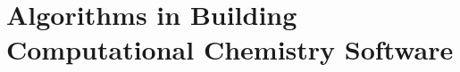 \documentclass[a4paper,12pt,oneside]{book}
\theoremstyle{definition}\newtheorem{law}{Law}
\theoremstyle{plain}\newtheorem{theorem}{Theorem}
\theoremstyle{remark}\newtheorem{remark}{Remark}
\theoremstyle{axiom}\newtheorem{axiom}{Axiom}
\numberwithin{law}{chapter}
\numberwithin{theorem}{chapter}
\numberwithin{remark}{chapter}
\begin{document}

\part{Algorithms in Building Computational Chemistry Software}


%
%
%
%
%
%
%

%
%
%
%





%



\end{document}
